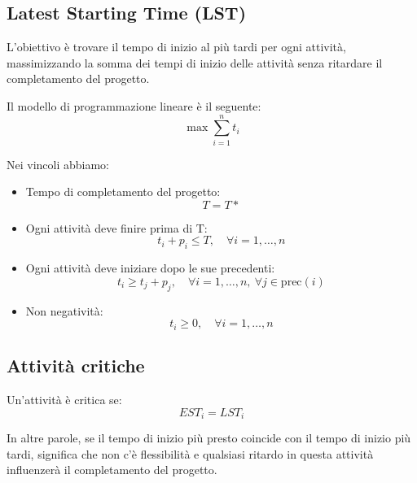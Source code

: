 \subsection{Latest Starting Time (LST)}
L'obiettivo è trovare il tempo di inizio al più tardi per ogni attività, 
massimizzando la somma dei tempi di inizio delle attività senza ritardare il 
completamento del progetto.

Il modello di programmazione lineare è il seguente:
\[ 
\max \sum_{i=1}^n t_i
\]

Nei vincoli abbiamo:
\begin{itemize}
    \item Tempo di completamento del progetto:
    \[T = T*\]
    \item Ogni attività deve finire prima di T:
    \[t_i + p_i \leq T, \quad \forall i = 1,\ldots,n\]
    \item Ogni attività deve iniziare dopo le sue precedenti:
    \[t_i \geq t_j + p_j, \quad \forall i = 1,\ldots,n,\ \forall j \in \text{prec}(i)\]
    \item Non negatività:
    \[t_i \geq 0, \quad \forall i = 1,\ldots,n\]
\end{itemize}

\subsection{Attività critiche}
Un'attività è critica se:
\[ 
EST_i = LST_i
\]

In altre parole, se il tempo di inizio più presto coincide con il tempo di inizio più tardi,
significa che non c'è flessibilità e qualsiasi ritardo in questa attività influenzerà il completamento del progetto.